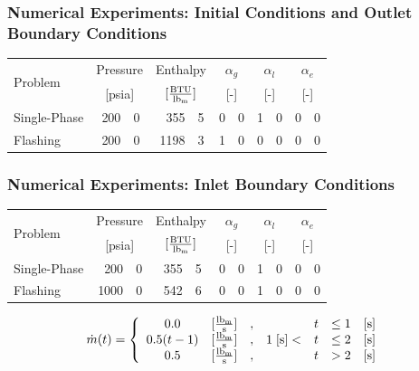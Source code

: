 \documentclass[compress,xcolor=table]{beamer}
\begin{document}
\begin{frame}
\frametitle{Numerical Experiments: Initial Conditions and Outlet Boundary Conditions}

\begin{table}[ht]
\centering
\begin{tabular}{@{}lr@{.}lr@{.}lr@{.}lr@{.}lr@{.}l@{}} \toprule
\multirow{2}{*}{Problem} & \multicolumn{2}{c}{Pressure} & \multicolumn{2}{c}{Enthalpy}             & \multicolumn{2}{c}{$\alpha_g$} & \multicolumn{2}{c}{$\alpha_l$} & \multicolumn{2}{c}{$\alpha_e$} \\ 
                         & \multicolumn{2}{c}{[psia]} & \multicolumn{2}{c}{$[\frac{\text{BTU}}{\lbm{}}]$} & \multicolumn{2}{c}{[-]}      & \multicolumn{2}{c}{[-]}      & \multicolumn{2}{c}{[-]}      \\ \midrule
Single-Phase & 200&0  &  355&5 & 0&0 & 1&0 & 0&0 \\
Flashing     & 200&0  & 1198&3 & 1&0 & 0&0 & 0&0 \\ \bottomrule  
\end{tabular}
\end{table}

\end{frame}
\begin{frame}
\frametitle{Numerical Experiments: Inlet Boundary Conditions}

\begin{table}[ht]
\centering
\begin{tabular}{@{}lr@{.}lr@{.}lr@{.}lr@{.}lr@{.}l@{}} \toprule
\multirow{2}{*}{Problem} & \multicolumn{2}{c}{Pressure} & \multicolumn{2}{c}{Enthalpy}             & \multicolumn{2}{c}{$\alpha_g$} & \multicolumn{2}{c}{$\alpha_l$} & \multicolumn{2}{c}{$\alpha_e$} \\ 
                         & \multicolumn{2}{c}{[psia]} & \multicolumn{2}{c}{$[\frac{\text{BTU}}{\lbm{}}]$} & \multicolumn{2}{c}{[-]}      & \multicolumn{2}{c}{[-]}      & \multicolumn{2}{c}{[-]}      \\ \midrule
Single-Phase &  200&0 & 355&5 & 0&0 & 1&0 & 0&0 \\
Flashing     & 1000&0 & 542&6 & 0&0 & 1&0 & 0&0 \\ \bottomrule  
\end{tabular}
\label{tab:bc_fe}
\end{table}

\begin{equation*}
\label{eqn:bc_time_func_single}
\dot{m}(t) = \left\{
\begin{array}{cclrcll}
 0.0           & [\frac{ \lbm{} }{\text{s}}] & , &                & t & \leq 1 & [\text{s}] \\
 0.5 ( t - 1)  & [\frac{ \lbm{} }{\text{s}}] & , & 1\; [\text{s}] < & t & \leq 2 & [\text{s}] \\
 0.5           & [\frac{ \lbm{} }{\text{s}}] & , &                & t & > 2    & [\text{s}]
\end{array}\right.
\end{equation*}

\end{frame}
\end{document}

